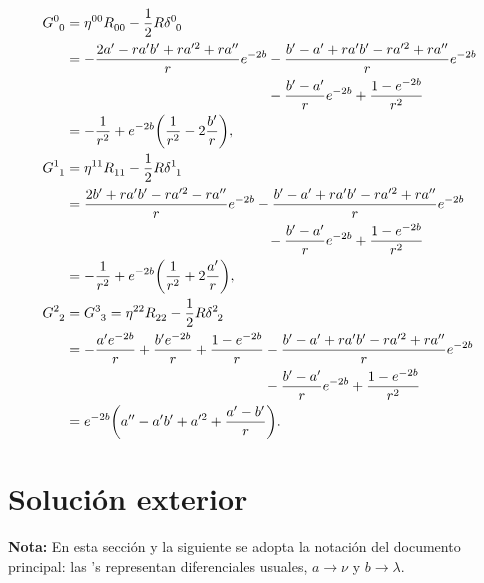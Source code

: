 \begin{subequations}
\begin{align}
    \tensor{G}{^0_0} &=  \tensor{\eta}{^0^0}\tensor{R}{_0_0}-\frac{1}{2}R\tensor{\delta}{^0_0} \nonumber \\
    &= - \frac{2a^\prime-r a^\prime b^\prime +r a^{\prime 2}+r a^{\prime\prime}}{r}e^{-2b} -\frac{b^\prime-a^\prime+r a^\prime b^\prime -r a^{\prime 2}+r a^{\prime\prime}}{r}e^{-2b} \nonumber \\
    &\phantom{{}= - \frac{2a^\prime-r a^\prime b^\prime +r a^{\prime 2}+r a^{\prime\prime}}{r}e^{-2b}} -\frac{b^\prime-a^\prime}{r}e^{-2b}+\frac{1-e^{-2b}}{r^2} \nonumber \\
    &= -\frac{1}{r^2}+e^{-2b}\qty(\frac{1}{r^2}-2\frac{b^\prime}{r}), \\
    \tensor{G}{^1_1} &=  \tensor{\eta}{^1^1}\tensor{R}{_1_1}-\frac{1}{2}R\tensor{\delta}{^1_1} \nonumber \\
    &= \frac{2b^\prime+r a^\prime b^\prime -r a^{\prime 2}-r a^{\prime\prime}}{r}e^{-2b} -\frac{b^\prime-a^\prime+r a^\prime b^\prime -r a^{\prime 2}+r a^{\prime\prime}}{r}e^{-2b} \nonumber \\
    &\phantom{{}= - \frac{2a^\prime-r a^\prime b^\prime +r a^{\prime 2}+r a^{\prime\prime}}{r}e^{-2b}}-\frac{b^\prime-a^\prime}{r}e^{-2b}+\frac{1-e^{-2b}}{r^2} \nonumber \\
    &= -\frac{1}{r^2}+e^{-2b}\qty(\frac{1}{r^2}+2\frac{a^\prime}{r}), \\
    \tensor{G}{^2_2}&=\tensor{G}{^3_3} =  \tensor{\eta}{^2^2}\tensor{R}{_2_2}-\frac{1}{2}R\tensor{\delta}{^2_2} \nonumber \\
    &=-\frac{a^\prime e^{-2b}}{r}+\frac{b^\prime e^{-2b}}{r}+\frac{1-e^{-2b}}{r}-\frac{b^\prime-a^\prime+r a^\prime b^\prime -r a^{\prime 2}+r a^{\prime\prime}}{r}e^{-2b} \nonumber \\
    &\phantom{{}= - \frac{a^\prime e^{-2b}}{r}+\frac{b^\prime e^{-2b}}{r}+\frac{1-e^{-2b}}{r}}-\frac{b^\prime-a^\prime}{r}e^{-2b}+\frac{1-e^{-2b}}{r^2} \nonumber \\
    &= e^{-2b}\qty(a^{\prime\prime}-a^{\prime}b^{\prime}+a^{\prime 2}+\frac{a^{\prime}-b^\prime}{r}).
\end{align}
\end{subequations}
\endgroup

\section{Solución exterior}
\noindent \small\textbf{Nota:} En esta sección y la siguiente se adopta la notación del documento principal: las 's representan diferenciales usuales, $a\to \nu$ y $b \to \lambda$.

